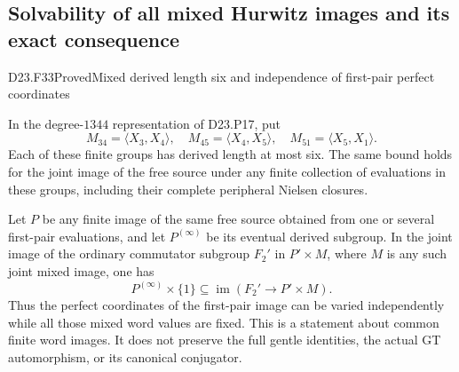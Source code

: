 \subsection{Solvability of all mixed Hurwitz images and its exact consequence}

\begin{statement}{D23.F33}{Proved}{Mixed derived length six and independence of first-pair perfect coordinates}
\end{statement}
In the degree-$1344$ representation of D23.P17, put
\[
 M_{34}=\langle X_3,X_4\rangle,\quad
 M_{45}=\langle X_4,X_5\rangle,\quad
 M_{51}=\langle X_5,X_1\rangle.
\]
Each of these finite groups has derived length at most six.
The same bound holds for the joint image of the free source
under any finite collection of evaluations in these groups,
including their complete peripheral Nielsen closures.

Let $P$ be any finite image of the same free source obtained
from one or several first-pair evaluations, and let
$P^{(\infty)}$ be its eventual derived subgroup. In the joint
image of the ordinary commutator subgroup $F_2'$ in
$P'\times M$, where $M$ is any such joint mixed image,
one has
\[
                    P^{(\infty)}\times\{1\}\subseteq
                 \operatorname{im}(F_2'\to P'\times M).
\]
Thus the perfect coordinates of the first-pair image can
be varied independently while all those mixed word values
are fixed. This is a statement about common finite word
images. It does not preserve the full gentle identities,
the actual GT automorphism, or its canonical conjugator.

